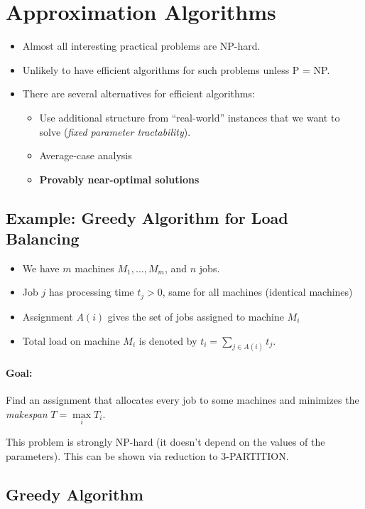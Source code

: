\section{Approximation Algorithms}

\begin{itemize}
\item Almost all interesting practical problems are NP-hard.
\item Unlikely to have efficient algorithms for such problems unless P = NP.
\item There are several alternatives for efficient algorithms:
\begin{itemize}
\item Use additional structure from ``real-world'' instances that we want to solve (\emph{fixed parameter tractability}).
\item Average-case analysis
\item \textbf{Provably near-optimal solutions}
\end{itemize}
\end{itemize}

\subsection{Example: Greedy Algorithm for Load Balancing}

\begin{itemize}
\item We have $m$ machines $M_1, \ldots, M_m$, and $n$ jobs.
\item Job $j$ has processing time $t_j > 0$, same for all machines (identical machines)
\item Assignment $A(i)$ gives the set of jobs assigned to machine $M_i$
\item Total load on machine $M_i$ is denoted by $t_i = \sum\limits_{j \in A(i)}{t_j}$. 
\end{itemize}

\paragraph{Goal:} Find an assignment that allocates every job to some machines and minimizes the \emph{makespan} $T = \max \limits_{i} T_i$.

This problem is strongly NP-hard (it doesn't depend on the values of the parameters). This can be shown via reduction to 3-PARTITION.

\newpage

\subsection{Greedy Algorithm}


